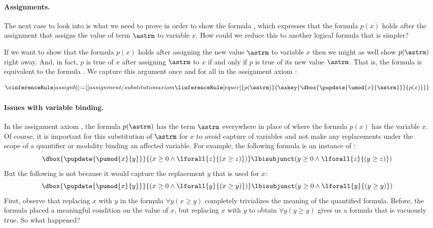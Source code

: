 \documentclass[11pt,twoside]{scrartcl}
\begin{document}
\paragraph{Assignments.}

The next case to look into is what we need to prove in order to show the formula , which expresses that the formula $p(x)$ holds after the assignment  that assigns the value of term $\astrm$ to variable $x$.
How could we reduce this to another logical formula that is simpler?

If we want to show that the formula $p(x)$ holds after assigning the new value $\astrm$ to variable $x$ then we might as well show $p(\astrm)$ right away.
And, in fact, $p$ is true of $x$ after assigning $\astrm$ to $x$ if and only if $p$ is true of its new value $\astrm$.
That is, the formula  is equivalent to the formula .
We capture this argument once and for all in the assignment axiom :

\[
\cinferenceRule[assignb|$\dibox{:=}$]{assignment / substitution axiom}
{\linferenceRule[equiv]
  {p(\astrm)}
  {\axkey{\dbox{\pupdate{\umod{x}{\astrm}}}{p(x)}}}
}
{}%
\]

\paragraph{Issues with variable binding.}
In the assignment axiom , the formula $p(\astrm)$ has the term $\astrm$ everywhere in place of where the formula $p(x)$ has the variable $x$.
Of course, it is important for this substitution of $\astrm$ for $x$ to avoid capture of variables and not make any replacements under the scope of a quantifier or modality binding an affected variable.
For example, the following formula is an instance of :
\[
\dbox{\pupdate{\pumod{x}{y}}}{(x\geq0 \land \lforall{z}{(x\geq z)})} \lbisubjunct (y\geq0 \land \lforall{z}{(y\geq z)})
\]
But the following is not because it would capture the replacement $y$ that is used for $x$:
\[
\dbox{\pupdate{\pumod{x}{y}}}{(x\geq0 \land \lforall{y}{(x\geq y)})} \lbisubjunct (y\geq0 \land \lforall{y}{(y\geq y)})
\]
First, observe that replacing $x$ with $y$ in the formula $\forall y (x \ge y)$ completely trivializes the meaning of the quantified formula.
Before, the formula placed a meaningful condition on the value of $x$, but replacing $x$ with $y$ to obtain $\forall y (y \ge y)$ gives us a formula that is vacuously true.
So what happened?
\end{document}
